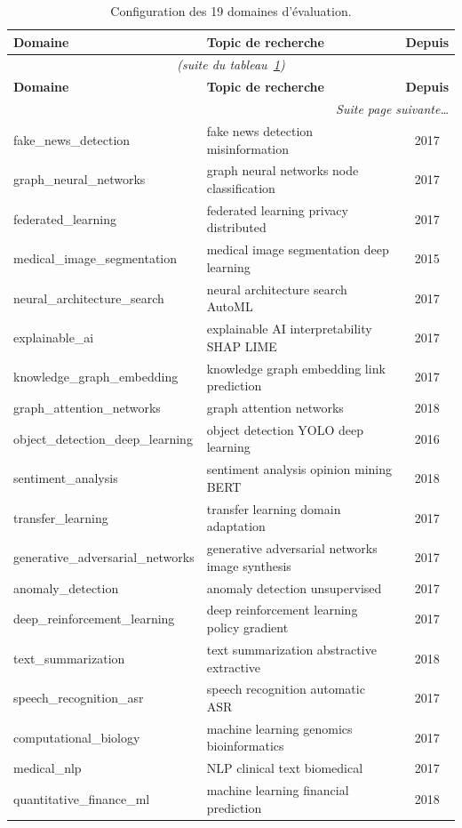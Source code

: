 \documentclass[12pt,a4paper,twoside]{report}
\begin{document}
\begin{longtable}{llc}
\caption{Configuration des 19 domaines d'évaluation.}
\label{tab:domains-config} \\
\toprule
\textbf{Domaine} & \textbf{Topic de recherche} & \textbf{Depuis} \\
\midrule
\endfirsthead
\multicolumn{3}{c}{\textit{(suite du tableau~\ref{tab:domains-config})}} \\
\toprule
\textbf{Domaine} & \textbf{Topic de recherche} & \textbf{Depuis} \\
\midrule
\endhead
\midrule
\multicolumn{3}{r}{\textit{Suite page suivante\ldots}} \\
\endfoot
\bottomrule
\endlastfoot
fake\_news\_detection & fake news detection misinformation & 2017 \\
graph\_neural\_networks & graph neural networks node classification & 2017 \\
federated\_learning & federated learning privacy distributed & 2017 \\
medical\_image\_segmentation & medical image segmentation deep learning & 2015 \\
neural\_architecture\_search & neural architecture search AutoML & 2017 \\
explainable\_ai & explainable AI interpretability SHAP LIME & 2017 \\
knowledge\_graph\_embedding & knowledge graph embedding link prediction & 2017 \\
graph\_attention\_networks & graph attention networks & 2018 \\
object\_detection\_deep\_learning & object detection YOLO deep learning & 2016 \\
sentiment\_analysis & sentiment analysis opinion mining BERT & 2018 \\
transfer\_learning & transfer learning domain adaptation & 2017 \\
generative\_adversarial\_networks & generative adversarial networks image synthesis & 2017 \\
anomaly\_detection & anomaly detection unsupervised & 2017 \\
deep\_reinforcement\_learning & deep reinforcement learning policy gradient & 2017 \\
text\_summarization & text summarization abstractive extractive & 2018 \\
speech\_recognition\_asr & speech recognition automatic ASR & 2017 \\
computational\_biology & machine learning genomics bioinformatics & 2017 \\
medical\_nlp & NLP clinical text biomedical & 2017 \\
quantitative\_finance\_ml & machine learning financial prediction & 2018 \\
\end{longtable}
\end{document}
